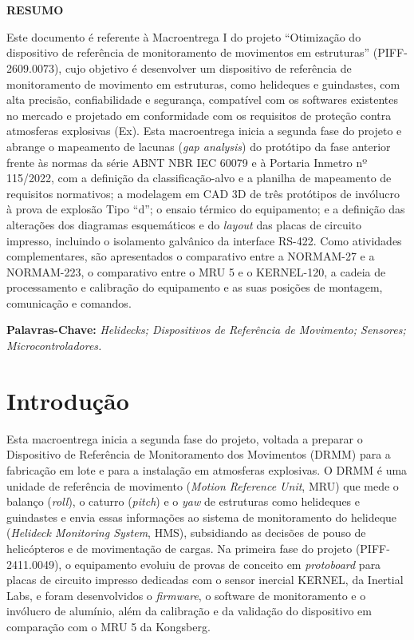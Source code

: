 \documentclass[a4paper, 12pt]{article}
\makeatletter
\renewcommand\tableofcontents{%
    \centering
    \section*{\contentsname
        \@mkboth{%
           \MakeUppercase\contentsname}{\MakeUppercase\contentsname}}%
    \@starttoc{toc}%
    }
\makeatother
\begin{document}

\pagestyle{modeloTexto}


\newpage
\tableofcontents
\newpage
\listoffigures
\newpage
\listoftables
\newpage
\raggedright
\justifying
\normalsize

\newpage
\begin{center}
    \Large \textbf{RESUMO}
\end{center}

Este documento é referente à Macroentrega I do projeto ``Otimização do dispositivo de referência de monitoramento de movimentos em estruturas'' (PIFF-2609.0073), cujo objetivo é desenvolver um dispositivo de referência de monitoramento de movimento em estruturas, como helideques e guindastes, com alta precisão, confiabilidade e segurança, compatível com os softwares existentes no mercado e projetado em conformidade com os requisitos de proteção contra atmosferas explosivas (Ex). Esta macroentrega inicia a segunda fase do projeto e abrange o mapeamento de lacunas (\textit{gap analysis}) do protótipo da fase anterior frente às normas da série ABNT NBR IEC 60079 e à Portaria Inmetro nº 115/2022, com a definição da classificação-alvo e a planilha de mapeamento de requisitos normativos; a modelagem em CAD 3D de três protótipos de invólucro à prova de explosão Tipo ``d''; o ensaio térmico do equipamento; e a definição das alterações dos diagramas esquemáticos e do \textit{layout} das placas de circuito impresso, incluindo o isolamento galvânico da interface RS-422. Como atividades complementares, são apresentados o comparativo entre a NORMAM-27 e a NORMAM-223, o comparativo entre o MRU 5 e o KERNEL-120, a cadeia de processamento e calibração do equipamento e as suas posições de montagem, comunicação e comandos.

\noindent
\textbf{Palavras-Chave:} \textit{Helidecks; Dispositivos de Referência de Movimento; Sensores; Microcontroladores.}

\newpage
\section{Introdução}

Esta macroentrega inicia a segunda fase do projeto, voltada a preparar o Dispositivo de Referência de Monitoramento dos Movimentos (DRMM) para a fabricação em lote e para a instalação em atmosferas explosivas. O DRMM é uma unidade de referência de movimento (\textit{Motion Reference Unit}, MRU) que mede o balanço (\textit{roll}), o caturro (\textit{pitch}) e o \textit{yaw} de estruturas como helideques e guindastes e envia essas informações ao sistema de monitoramento do helideque (\textit{Helideck Monitoring System}, HMS), subsidiando as decisões de pouso de helicópteros e de movimentação de cargas. Na primeira fase do projeto (PIFF-2411.0049), o equipamento evoluiu de provas de conceito em \textit{protoboard} para placas de circuito impresso dedicadas com o sensor inercial KERNEL, da Inertial Labs, e foram desenvolvidos o \textit{firmware}, o software de monitoramento e o invólucro de alumínio, além da calibração e da validação do dispositivo em comparação com o MRU 5 da Kongsberg.
\end{document}

